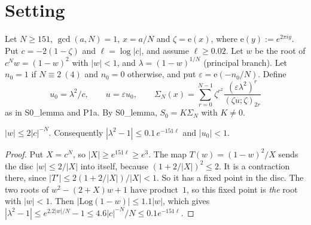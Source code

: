 \documentclass[11pt]{article}
\theoremstyle{definition}\newtheorem{definition}[theorem]{Definition}
\theoremstyle{remark}\newtheorem{remark}[theorem]{Remark}
\newcommand{\e}{\mathrm{e}}
\begin{document}
\section{Setting}
Let $N\ge151$, $\gcd(a,N)=1$, $x=a/N$ and $\zeta=\e(x)$, where $\e(y):=e^{2\pi i y}$. Put $c=-2(1-\zeta)$ and $\ell=\log|c|$, and assume $\ell\ge0.02$.
Let $w$ be the root of $c^Nw=(1-w)^2$ with $|w|<1$, and $\lambda=(1-w)^{1/N}$ (principal branch).
Let $n_0=1$ if $N\equiv2\ (4)$ and $n_0=0$ otherwise, and put $\varepsilon=\e(-n_0/N)$. Define
\[u_0=\lambda^2/c,\qquad u=\varepsilon u_0,\qquad \Sigma_N(x)=\sum_{r=0}^{N-1}\zeta^{r^2}\frac{(\varepsilon\lambda^2)^r}{(\zeta u;\zeta)_{2r}}\]
as in S0\_lemma and P1a. By S0\_lemma, $S_0=K\Sigma_N$ with $K\neq0$.

\begin{lemma}[W, PROVED]\label{lem:W}
$|w|\le2|c|^{-N}$. Consequently $|\lambda^2-1|\le 0.1\,e^{-151\ell}$ and $|u_0|<1$.
\end{lemma}
\begin{proof}
Put $X=c^N$, so $|X|\ge e^{151\ell}\ge e^{3}$. The map $T(w)=(1-w)^2/X$ sends the disc $|w|\le2/|X|$ into itself, because $(1+2/|X|)^2\le2$. It is a contraction there, since $|T'|\le2(1+2/|X|)/|X|<1$. So it has a fixed point in the disc.
The two roots of $w^2-(2+X)w+1$ have product~$1$, so this fixed point is \emph{the} root with $|w|<1$.
Then $|\mathrm{Log}(1-w)|\le1.1|w|$, which gives $|\lambda^2-1|\le e^{2.2|w|/N}-1\le 4.6|c|^{-N}/N\le0.1e^{-151\ell}$.
\end{proof}
\end{document}
